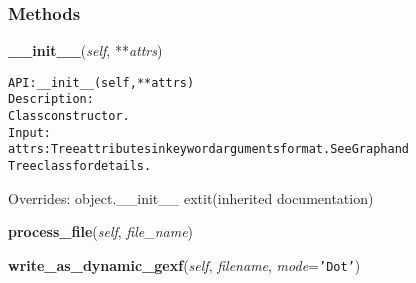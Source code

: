   \subsubsection{Methods}

    \vspace{0.5ex}

\hspace{.8\funcindent}\begin{boxedminipage}{\funcwidth}

    \raggedright \textbf{\_\_init\_\_}(\textit{self}, **\textit{attrs})

\setlength{\parskip}{2ex}
\begin{alltt}

API: \_\_init\_\_(self, **attrs)
Description:
    Class constructor.
Input:
    attrs: Tree attributes in keyword arguments format. See Graph and
    Tree class for details.
\end{alltt}

\setlength{\parskip}{1ex}
      Overrides: object.\_\_init\_\_ 	extit{(inherited documentation)}

    \end{boxedminipage}

    \label{coinor:grumpy:BB:BBTree:process_file}

    \vspace{0.5ex}

\hspace{.8\funcindent}\begin{boxedminipage}{\funcwidth}

    \raggedright \textbf{process\_file}(\textit{self}, \textit{file\_name})

\setlength{\parskip}{2ex}
\setlength{\parskip}{1ex}
    \end{boxedminipage}

    \label{coinor:grumpy:BB:BBTree:write_as_dynamic_gexf}

    \vspace{0.5ex}

\hspace{.8\funcindent}\begin{boxedminipage}{\funcwidth}

    \raggedright \textbf{write\_as\_dynamic\_gexf}(\textit{self}, \textit{filename}, \textit{mode}={\tt \texttt{'}\texttt{Dot}\texttt{'}})

\setlength{\parskip}{2ex}
\setlength{\parskip}{1ex}
    \end{boxedminipage}

